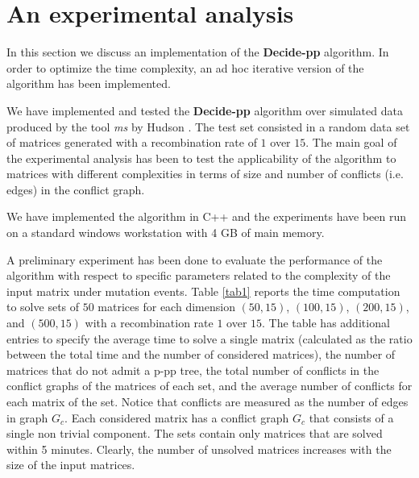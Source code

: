 \documentclass{llncs}
\newcommand{\pp}{Decide-pp}
\begin{document}
\section{An experimental analysis}
\label{experiment}

In  this section we discuss an implementation of  the {\bf  \pp} algorithm. In order to optimize the time complexity, an ad hoc  iterative version of the algorithm has been implemented.


We have implemented  and tested the {\bf  \pp} algorithm over simulated data produced by  the tool  \textit{ms} by Hudson \cite{Hu}.   The test set consisted in a random data set of matrices generated with a recombination rate of $1$ over $15$.  The main goal of the experimental analysis has been to test the applicability of the algorithm to matrices with different complexities in terms of size and number of conflicts (i.e. edges)  in the conflict graph.

We have implemented the algorithm   in C++ and the 
experiments have been run on a standard windows workstation with 4 GB of main memory. 

A preliminary experiment has been done to evaluate the performance of the algorithm with respect to specific parameters related 
to the complexity of the input matrix under mutation events.
Table \ref{tab1} reports  the time computation to solve sets of $50$ matrices for each dimension $(50,15)$,  $(100,15)$,  $(200,15)$, and  $(500,15)$ with a recombination rate $1$ over $15$. 
The table has additional entries to specify  the average time to solve a single matrix (calculated as the ratio between the total time and the number of considered matrices), the  number of matrices that do not admit a p-pp tree, the total number of conflicts in the conflict graphs of the matrices of each set, and the average number of conflicts for each matrix of the set.  Notice that conflicts are measured as the number of edges in graph $G_c$.
Each considered matrix has a conflict graph $G_c$  that consists of a single 
non trivial component. The sets contain only matrices that are solved within 5 minutes. Clearly, the number of unsolved matrices increases with the size of the input matrices.
\end{document}
